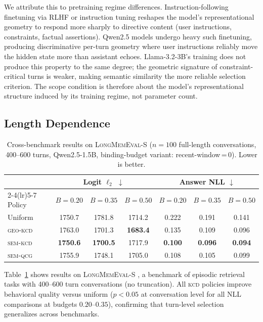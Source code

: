 \documentclass[11pt]{article}
\newcommand{\kcd}{\textsc{kcd}}
\newcommand{\semqcg}{\textsc{sem-qcg}}
\newcommand{\geokcd}{\textsc{geo-kcd}}
\newcommand{\semkcd}{\textsc{sem-kcd}}
\newcommand{\lme}{\textsc{LongMemEval-S}}
\begin{document}
We attribute this to pretraining regime differences.
Instruction-following finetuning via RLHF or instruction tuning
\citep{ouyang-etal-2022-training, wei-etal-2022-finetuned}
reshapes the model's representational geometry to respond more sharply
to directive content (user instructions, constraints, factual assertions).
Qwen2.5 models undergo heavy such finetuning,
producing discriminative per-turn geometry where user instructions
reliably move the hidden state more than assistant echoes.
Llama-3.2-3B's training does not produce this property to the same degree;
the geometric signature of constraint-critical turns is weaker,
making semantic similarity the more reliable selection criterion.
The scope condition is therefore about the model's representational structure
induced by its training regime, not parameter count.

\subsection{Length Dependence}

\begin{table}[t]
\centering
\caption{Cross-benchmark results on \lme{} ($n{=}100$ full-length conversations,
400--600 turns, Qwen2.5-1.5B, binding-budget variant: recent-window\,=\,0). Lower is better.}
\label{tab:lme}
\setlength{\tabcolsep}{5pt}
\begin{tabular}{lcccccc}
\toprule
& \multicolumn{3}{c}{Logit $\ell_2$ $\downarrow$} & \multicolumn{3}{c}{Answer NLL $\downarrow$} \\
\cmidrule(lr){2-4}\cmidrule(lr){5-7}
Policy & $B{=}0.20$ & $B{=}0.35$ & $B{=}0.50$ & $B{=}0.20$ & $B{=}0.35$ & $B{=}0.50$ \\
\midrule
Uniform   & 1750.7 & 1781.8 & 1714.2 & 0.222 & 0.191 & 0.141 \\
\geokcd{} & 1763.0 & 1701.3 & \textbf{1683.4} & 0.135 & 0.109 & 0.096 \\
\semkcd{} & \textbf{1750.6} & \textbf{1700.5} & 1717.9 & \textbf{0.100} & \textbf{0.096} & \textbf{0.094} \\
\semqcg{} & 1755.9 & 1748.1 & 1705.0 & 0.108 & 0.105 & 0.099 \\
\bottomrule
\end{tabular}
\end{table}

Table~\ref{tab:lme} shows results on \lme{} \citep{wu-etal-2025-longmemeval},
a benchmark of episodic retrieval tasks with 400--600 turn conversations
(no truncation).
All \kcd{} policies improve behavioral quality versus uniform
($p < 0.05$ at conversation level for all NLL comparisons at budgets $0.20$--$0.35$),
confirming that turn-level selection generalizes across benchmarks.
\end{document}
